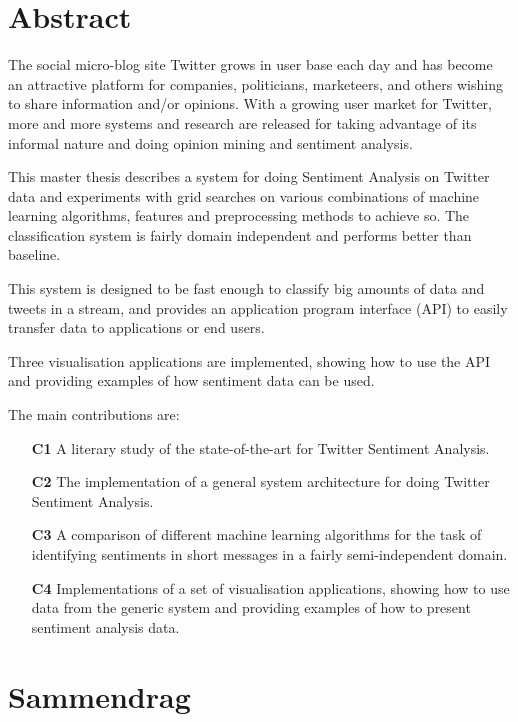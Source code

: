 \section*{Abstract}

The social micro-blog site Twitter grows in user base each day and has become an attractive platform for companies, politicians, marketeers, and others wishing to share information and/or opinions. With a growing user market for Twitter, more and more systems and research are released for taking advantage of its informal nature and doing opinion mining and sentiment analysis. 

This master thesis describes a system for doing Sentiment Analysis on Twitter data and experiments with grid searches on various combinations of machine learning algorithms, features and preprocessing methods to achieve so. The classification system is fairly domain independent and performs better than baseline. 

This system is designed to be fast enough to classify big amounts of data and tweets in a stream, and provides an application program interface (API) to easily transfer data to applications or end users. 

Three visualisation applications are implemented, showing how to use the API and providing examples of how sentiment data can be used.

The main contributions are: 

\begin{itemize}
\item[\textbf{C1}] A literary study of the state-of-the-art for Twitter Sentiment Analysis.

\item[\textbf{C2}] The implementation of a general system architecture for doing Twitter Sentiment Analysis. 

\item[\textbf{C3}] A comparison of different machine learning algorithms for the task of identifying sentiments in short messages in a fairly semi-independent domain.

\item[\textbf{C4}] Implementations of a set of visualisation applications, showing how to use data from the generic system and providing examples of how to present sentiment analysis data.
\end{itemize}

\clearpage

\section*{Sammendrag}

